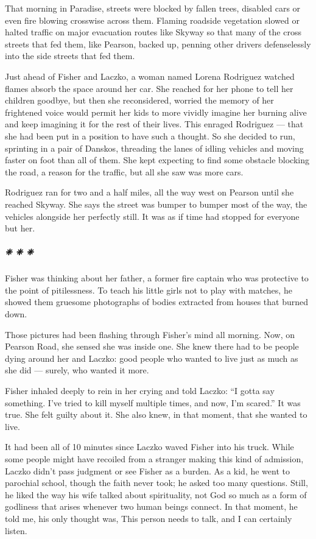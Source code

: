 That morning in Paradise, streets were blocked by fallen trees, disabled
cars or even fire blowing crosswise across them. Flaming roadside
vegetation slowed or halted traffic on major evacuation routes like
Skyway so that many of the cross streets that fed them, like Pearson,
backed up, penning other drivers defenselessly into the side streets
that fed them.

Just ahead of Fisher and Laczko, a woman named Lorena Rodriguez watched
flames absorb the space around her car. She reached for her phone to
tell her children goodbye, but then she reconsidered, worried the memory
of her frightened voice would permit her kids to more vividly imagine
her burning alive and keep imagining it for the rest of their lives.
This enraged Rodriguez --- that she had been put in a position to have
such a thought. So she decided to run, sprinting in a pair of Danskos,
threading the lanes of idling vehicles and moving faster on foot than
all of them. She kept expecting to find some obstacle blocking the road,
a reason for the traffic, but all she saw was more cars.

Rodriguez ran for two and a half miles, all the way west on Pearson
until she reached Skyway. She says the street was bumper to bumper most
of the way, the vehicles alongside her perfectly still. It was as if
time had stopped for everyone but her.

\hypertarget{---3}{%
\subparagraph{❈ ❈ ❈}\label{---3}}

Fisher was thinking about her father, a former fire captain who was
protective to the point of pitilessness. To teach his little girls not
to play with matches, he showed them gruesome photographs of bodies
extracted from houses that burned down.

Those pictures had been flashing through Fisher's mind all morning. Now,
on Pearson Road, she sensed she was inside one. She knew there had to be
people dying around her and Laczko: good people who wanted to live just
as much as she did --- surely, who wanted it more.

Fisher inhaled deeply to rein in her crying and told Laczko: ``I gotta
say something. I've tried to kill myself multiple times, and now, I'm
scared.'' It was true. She felt guilty about it. She also knew, in that
moment, that she wanted to live.

It had been all of 10 minutes since Laczko waved Fisher into his truck.
While some people might have recoiled from a stranger making this kind
of admission, Laczko didn't pass judgment or see Fisher as a burden. As
a kid, he went to parochial school, though the faith never took; he
asked too many questions. Still, he liked the way his wife talked about
spirituality, not God so much as a form of godliness that arises
whenever two human beings connect. In that moment, he told me, his only
thought was, This person needs to talk, and I can certainly listen.

